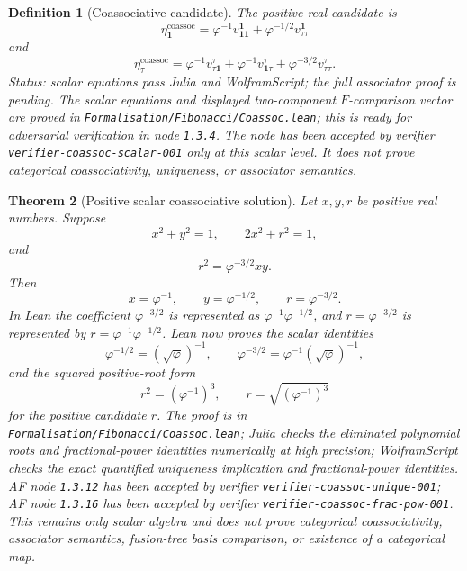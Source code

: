 \documentclass[11pt]{article}
\newtheorem{definition}{Definition}[section]
\newtheorem{theorem}[definition]{Theorem}
\begin{document}
\begin{definition}[Coassociative candidate]
The positive real candidate is
\[
\eta_{\mathbf 1}^{\mathrm{coassoc}}=
\varphi^{-1}v^{\mathbf 1}_{\mathbf 1\mathbf 1}
+\varphi^{-1/2}v^{\mathbf 1}_{\tau\tau}
\]
and
\[
\eta_\tau^{\mathrm{coassoc}}=
\varphi^{-1}v^\tau_{\tau\mathbf 1}
+\varphi^{-1}v^\tau_{\mathbf 1\tau}
+\varphi^{-3/2}v^\tau_{\tau\tau}.
\]
Status: scalar equations pass Julia and WolframScript; the full associator
proof is pending. The scalar equations and displayed two-component
\(F\)-comparison vector are proved in
\texttt{Formalisation/Fibonacci/Coassoc.lean}; this is ready for adversarial
verification in node \texttt{1.3.4}. The node has been accepted by verifier
\texttt{verifier-coassoc-scalar-001} only at this scalar level. It does not
prove categorical coassociativity, uniqueness, or associator semantics.
\end{definition}

\begin{theorem}[Positive scalar coassociative solution]
Let \(x,y,r\) be positive real numbers. Suppose
\[
x^2+y^2=1,\qquad 2x^2+r^2=1,
\]
and
\[
r^2=\varphi^{-3/2}xy.
\]
Then
\[
x=\varphi^{-1},\qquad y=\varphi^{-1/2},\qquad r=\varphi^{-3/2}.
\]
In Lean the coefficient \(\varphi^{-3/2}\) is represented as
\(\varphi^{-1}\varphi^{-1/2}\), and \(r=\varphi^{-3/2}\) is represented by
\(r=\varphi^{-1}\varphi^{-1/2}\). Lean now proves the scalar identities
\[
\varphi^{-1/2}=(\sqrt\varphi)^{-1},\qquad
\varphi^{-3/2}=\varphi^{-1}(\sqrt\varphi)^{-1},
\]
and the squared positive-root form
\[
r^2=(\varphi^{-1})^3,\qquad r=\sqrt{(\varphi^{-1})^3}
\]
for the positive candidate \(r\). The proof is in
\texttt{Formalisation/Fibonacci/Coassoc.lean}; Julia checks the eliminated
polynomial roots and fractional-power identities numerically at high
precision; WolframScript checks the exact quantified uniqueness implication
and fractional-power identities. AF node \texttt{1.3.12} has been accepted by
verifier \texttt{verifier-coassoc-unique-001}; AF node \texttt{1.3.16} has
been accepted by verifier \texttt{verifier-coassoc-frac-pow-001}. This
remains only scalar algebra and does not prove categorical coassociativity,
associator semantics, fusion-tree basis comparison, or existence of a
categorical map.
\end{theorem}
\end{document}
